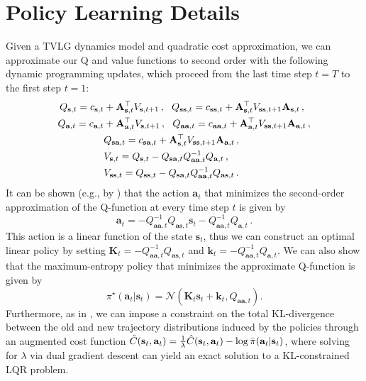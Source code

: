 \section{Policy Learning Details}
\label{sec:supp-lqr}

Given a TVLG dynamics model and quadratic cost approximation, we can approximate our Q and value functions to second order with the following dynamic programming updates, which proceed from the last time step $t = T$ to the first step $t = 1$:
\begin{align*}
    Q_{\mathbf{s},t}=c_{\mathbf{s},t}&+\mathbf{A}_{\mathbf{s},t}^\top{V}_{\mathbf{s},t+1}\,,~~Q_{\mathbf{ss},t}=c_{\mathbf{ss},t}+\mathbf{A}_{\mathbf{s},t}^\top{V}_{\mathbf{ss},t+1}\mathbf{A}_{\mathbf{s},t}\,,\\
    Q_{\mathbf{a},t}=c_{\mathbf{a},t}&+\mathbf{A}_{\mathbf{a},t}^\top{V}_{\mathbf{s},t+1}\,,~~Q_{\mathbf{aa},t}=c_{\mathbf{aa},t}+\mathbf{A}_{\mathbf{a},t}^\top{V}_{\mathbf{ss},t+1}\mathbf{A}_{\mathbf{a},t}\,,\\
    &Q_{\mathbf{sa},t}=c_{\mathbf{sa},t}+\mathbf{A}_{\mathbf{s},t}^\top{V}_{\mathbf{ss},t+1}\mathbf{A}_{\mathbf{a},t}\,,\\
    &V_{\mathbf{s},t}=Q_{\mathbf{s},t}-Q_{\mathbf{sa},t}Q_{\mathbf{aa},t}^{-1}Q_{\mathbf{a},t}\,,\\
    &V_{\mathbf{ss},t}=Q_{\mathbf{ss},t}-Q_{\mathbf{sa},t}Q_{\mathbf{aa},t}^{-1}Q_{\mathbf{as},t}\,.
\end{align*}
It can be shown (e.g., by \citet{synthesis}) that the action $\mathbf{a}_t$ that minimizes the second-order approximation of the Q-function at every time step $t$ is given by
\[
\mathbf{a}_t=-Q_{\mathbf{aa},t}^{-1}Q_{\mathbf{as},t}\mathbf{s}_t-Q_{\mathbf{aa},t}^{-1}Q_{\mathbf{a},t}\,.
\]
This action is a linear function of the state $\mathbf{s}_t$, thus we can construct an optimal linear policy by setting $\mathbf{K}_t=-Q_{\mathbf{aa},t}^{-1}Q_{\mathbf{as},t}$ and $\mathbf{k}_t=-Q_{\mathbf{aa},t}^{-1}Q_{\mathbf{a},t}$. We can also show that the maximum-entropy policy that minimizes the approximate Q-function is given by
\[
\pi^\star(\mathbf{a}_t|\mathbf{s}_t)=\mathcal{N}(\mathbf{K}_t\mathbf{s}_t+\mathbf{k}_t,Q_{\mathbf{aa},t}).
\]
Furthermore, as in \citet{mfcgps}, we can impose a constraint on the total KL-divergence between the old and new trajectory distributions induced by the policies through an augmented cost function $\tilde{C}(\mathbf{s}_t,\mathbf{a}_t)=\frac{1}{\lambda}\hat{C}(\mathbf{s}_t,\mathbf{a}_t)-\log\bar{\pi}(\mathbf{a}_t|\mathbf{s}_t)$, where solving for $\lambda$ via dual gradient descent can yield an exact solution to a KL-constrained LQR problem.


